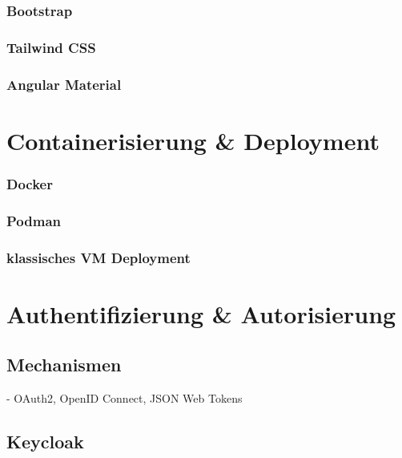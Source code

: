 \subsubsection{Bootstrap}
\subsubsection{Tailwind CSS}
\subsubsection{Angular Material}

\section{Containerisierung \& Deployment}
\subsubsection{Docker}
\subsubsection{Podman}
\subsubsection{klassisches VM Deployment}


\section{Authentifizierung \& Autorisierung}
\subsection{Mechanismen}
- OAuth2, OpenID Connect, JSON Web Tokens
\subsection{Keycloak}
